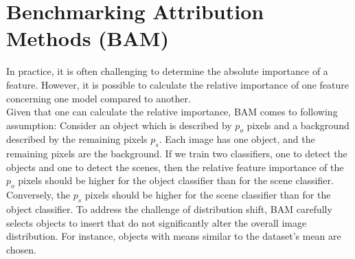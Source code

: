 \section{Benchmarking Attribution Methods (BAM)}
\label{sec:bam}
In practice, it is often challenging to determine the absolute importance of a feature. However, it is possible to calculate the relative importance of one feature concerning one model compared to another\cite{yang2019benchmarking}.\\

Given that one can calculate the relative importance, BAM\cite{yang2019benchmarking} comes to following assumption:
Consider an object which is described by $p_o$ pixels and a background described by the remaining pixels $p_s$. Each image has one object, and the remaining pixels are the background. If we train two classifiers, one to detect the objects and one to detect the scenes, then the relative feature importance of the $p_o$ pixels should be higher for the object classifier than for the scene classifier. Conversely, the $p_s$ pixels should be higher for the scene classifier than for the object classifier. To address the challenge of distribution shift, BAM carefully selects objects to insert that do not significantly alter the overall image distribution. For instance, objects with means similar to the dataset's mean are chosen. 



